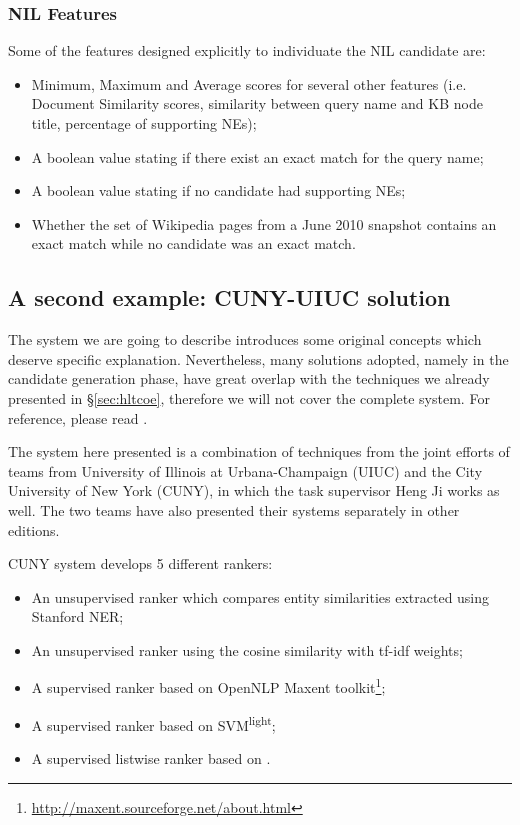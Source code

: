 \documentclass[a4paper,11pt]{report}
\begin{document}
\subsubsection{NIL Features}
Some of the features designed explicitly to individuate the NIL candidate are:
\begin{itemize}
\item Minimum, Maximum and Average scores for several other features (i.e. Document Similarity scores, similarity between query name and KB node title, percentage of supporting NEs);
\item A boolean value stating if there exist an exact match for the query name;
\item A boolean value stating if no candidate had supporting NEs;
\item Whether the set of Wikipedia pages from a June 2010 snapshot contains an exact match while no candidate was an exact match.
\end{itemize}


\subsection{A second example: CUNY-UIUC solution}
\label{sec:uiuc}
The system we are going to describe introduces some original concepts which deserve specific explanation. Nevertheless, many solutions adopted, namely in the candidate generation phase, have great overlap with the techniques we already presented in \S \ref{sec:hltcoe}, therefore we will not cover the complete system. For reference, please read \cite{2011cuny, chen2010cuny, 2012cuny}.

The system here presented is a combination of techniques from the joint efforts of teams from University of Illinois at Urbana-Champaign (UIUC) and the City University of New York (CUNY), in which the task supervisor Heng Ji works as well. The two teams have also presented their systems separately in other editions.

CUNY system develops 5 different rankers:
\begin{itemize}
\item An unsupervised ranker which compares entity similarities extracted using Stanford NER;
\item An unsupervised ranker using the cosine similarity with tf-idf weights;
\item A supervised ranker based on OpenNLP Maxent toolkit\footnote{\url{http://maxent.sourceforge.net/about.html}}; 
\item A supervised ranker based on SVM\textsuperscript{light};
\item A supervised listwise ranker based on \citet{cao2007}.
\end{itemize}
\end{document}
